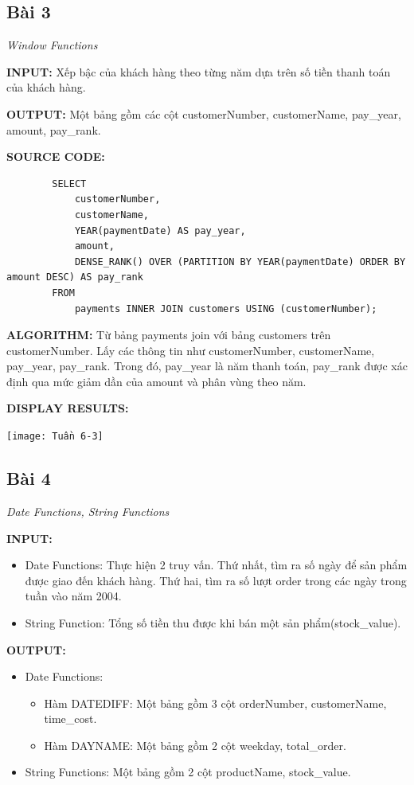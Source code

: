 \documentclass[12pt,a4paper]{report}
\begin{document}
\subsection{Bài 3}
	\begin{center}
		{\it Window Functions}
	\end{center}
	
	{\bf INPUT:} Xếp bậc của khách hàng theo từng năm dựa trên số tiền thanh toán của khách hàng.
	
	{\bf OUTPUT:} Một bảng gồm các cột customerNumber, customerName, pay\_year, amount, pay\_rank.
	
	{\bf SOURCE CODE:}
	\begin{lstlisting}
		SELECT
			customerNumber,
			customerName,
    		YEAR(paymentDate) AS pay_year,
    		amount,
    		DENSE_RANK() OVER (PARTITION BY YEAR(paymentDate) ORDER BY amount DESC) AS pay_rank
		FROM
			payments INNER JOIN customers USING (customerNumber);
	\end{lstlisting}
	
	{\bf ALGORITHM:} Từ bảng payments join với bảng customers trên customerNumber. Lấy các thông tin như customerNumber, customerName, pay\_year, pay\_rank. Trong đó, pay\_year là năm thanh toán, pay\_rank được xác định qua mức giảm dần của amount và phân vùng theo năm.
	
	{\bf DISPLAY RESULTS:}
	\begin{center}
		\texttt{[image: Tuần 6-3]}
	\end{center}
\subsection{Bài 4}
	\begin{center}
		{\it Date Functions, String Functions}
	\end{center}
	
	{\bf INPUT:}
	\begin{itemize}
		\item Date Functions: Thực hiện 2 truy vấn. Thứ nhất, tìm ra số ngày để sản phẩm được giao đến khách hàng. Thứ hai, tìm ra số lượt order trong các ngày trong tuần vào năm 2004.
		\item String Function: Tổng số tiền thu được khi bán một sản phẩm(stock\_value).
	\end{itemize}
	
	{\bf OUTPUT:}
	\begin{itemize}
		\item Date Functions:
			\begin{itemize}
				\item Hàm DATEDIFF: Một bảng gồm 3 cột orderNumber, customerName, time\_cost.
				\item Hàm DAYNAME: Một bảng gồm 2 cột weekday, total\_order.
			\end{itemize}
		\item String Functions: Một bảng gồm 2 cột productName, stock\_value.
	\end{itemize}
	
\end{document}

